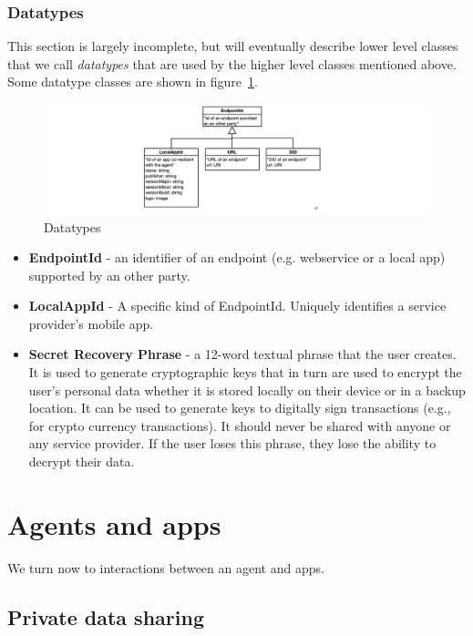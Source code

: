 \documentclass[11pt, oneside]{article}   	%
\begin{document}
\subsubsection{Datatypes}

This section is largely incomplete, but will eventually describe lower level classes that we call \emph{datatypes} that are used by the higher level classes mentioned above. Some datatype classes are shown in figure~\ref{fig:datatypes}.

\begin{figure}[htbp]
\includegraphics[width=\textwidth]{./images/datatypes.png}
\caption{Datatypes}
\label{fig:datatypes}
\end{figure}

\begin{itemize}
\item \textbf{EndpointId} -  an identifier of an endpoint (e.g. webservice or a local app) supported by an other party.
\item \textbf{LocalAppId} - A specific kind of EndpointId. Uniquely identifies a service provider's mobile app. 
\item \textbf{Secret Recovery Phrase} - a 12-word textual phrase that the user creates. It is used to generate cryptographic keys that in turn are used to encrypt the user’s personal data whether it is stored locally on their device or in a backup location. It can be used to generate keys to digitally sign transactions (e.g., for crypto currency transactions). It should never be shared with anyone or any service provider. If the user loses this phrase, they lose the ability to decrypt their data. 
\end{itemize}

\section{Agents and apps} %

We turn now to interactions between an agent and apps. 

\subsection{Private data sharing}
\end{document}
